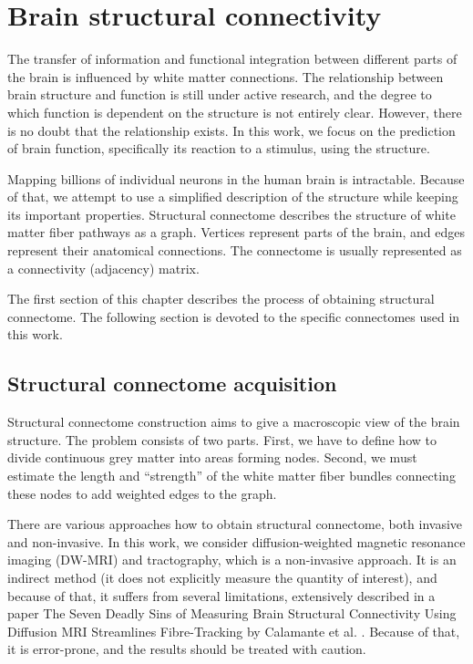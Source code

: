 \chapter{Brain structural connectivity}

The transfer of information and functional integration between different parts of the brain is influenced by white matter connections. The relationship between brain structure and function is still under active research, and the degree to which function is dependent on the structure is not entirely clear. However, there is no doubt that the relationship exists. \cite{sotiropoulos_building_2019} In this work, we focus on the prediction of brain function, specifically its reaction to a stimulus, using the structure. 

Mapping billions of individual neurons in the human brain is intractable. Because of that, we attempt to use a simplified description of the structure while keeping its important properties. Structural connectome describes the structure of white matter fiber pathways as a graph. Vertices represent parts of the brain, and edges represent their anatomical connections. The connectome is usually represented as a connectivity (adjacency) matrix. \cite{yeh_mapping_2021}

The first section of this chapter describes the process of obtaining structural connectome. The following section is devoted to the specific connectomes used in this work.

\section{Structural connectome acquisition}


Structural connectome construction aims to give a macroscopic view of the brain structure. The problem consists of two parts. First, we have to define how to divide continuous grey matter into areas forming nodes. Second, we must estimate the length and \enquote{strength} of the white matter fiber bundles connecting these nodes to add weighted edges to the graph.

There are various approaches how to obtain structural connectome, both invasive and non-invasive. In this work, we consider diffusion-weighted magnetic resonance imaging (DW-MRI) and tractography, which is a non-invasive approach. It is an indirect method (it does not explicitly measure the quantity of interest), and because of that, it suffers from several limitations, extensively described in a paper The Seven Deadly Sins of Measuring Brain Structural Connectivity Using Diffusion MRI Streamlines Fibre-Tracking by Calamante et al. \cite{calamante_seven_2019}. Because of that, it is error-prone, and the results should be treated with caution. \cite{sotiropoulos_building_2019}

